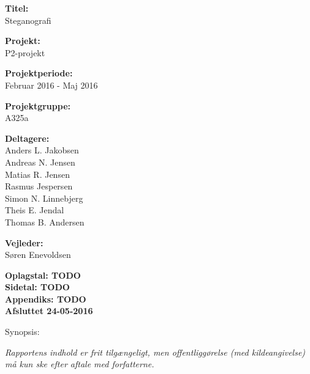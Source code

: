 \begin{minipage}[t]{0.48\textwidth}
\textbf{Titel:} \\[5pt]\bigskip\hspace{2ex}
Steganografi

\textbf{Projekt:} \\[5pt]\bigskip\hspace{2ex}
P2-projekt

\textbf{Projektperiode:} \\[5pt]\bigskip\hspace{2ex}
Februar 2016 - Maj 2016

\textbf{Projektgruppe:} \\[5pt]\bigskip\hspace{2ex}
A325a	

\textbf{Deltagere:} \\[5pt]\hspace*{2ex}
Anders L. Jakobsen \\\hspace*{2ex}
Andreas N. Jensen \\\hspace*{2ex}
Matias R. Jensen \\\hspace*{2ex}
Rasmus Jespersen \\\hspace*{2ex}
Simon N. Linnebjerg \\\hspace*{2ex}
Theis E. Jendal\\\bigskip\hspace{2ex}
Thomas B. Andersen

\textbf{Vejleder:} \\[5pt]\hspace*{2ex}
Søren Enevoldsen

\vspace*{1cm}

\textbf{Oplagstal: TODO} \\
\textbf{Sidetal: TODO} \\
\textbf{Appendiks: TODO} \\ 
\textbf{Afsluttet 24-05-2016}

\end{minipage}
\hfill
\begin{minipage}[t]{0.483\textwidth}
Synopsis: \\[5pt]
\fbox{\parbox{7cm}{\bigskip\bigskip}}
\end{minipage}

\vfill

{\footnotesize\itshape Rapportens indhold er frit tilgængeligt, men offentliggørelse (med kildeangivelse) må kun ske efter aftale med forfatterne.}


